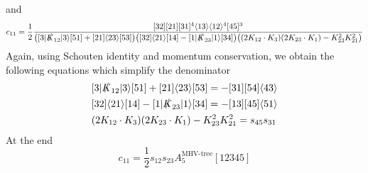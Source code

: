 and
\begin{equation}
c_{11} = \frac{1}{2}\frac{[32][21][31]^4\langle 13\rangle\langle 12 \rangle^4 [45]^3}{\big( [3|\slashed{K}_{12}|3\rangle [51] + [21]\langle 23\rangle [53]\big)
\big( [32]\langle 21\rangle[14] - [1|\slashed{K}_{23}|1\rangle[34]\big)
\big( (2K_{12}\cdot K_3)(2K_{23}\cdot K_1) - K_{23}^2K_{21}^2\big)
}
\end{equation}
Again, using Schouten identity and momentum conservation, we obtain the following equations which simplify the denominator
\begin{equation}
\begin{split}
& [3|\slashed{K}_{12}|3\rangle [51] + [21]\langle 23\rangle [53] = -[31][54]\langle 43 \rangle 
\\
& [32]\langle 21\rangle[14] - [1|\slashed{K}_{23}|1\rangle[34] = -[13][45]\langle 51 \rangle
\\
&
(2K_{12}\cdot K_3)(2K_{23}\cdot K_1) - K_{23}^2K_{21}^2 = s_{45}s_{31}
\end{split}
\end{equation}
At the end
\begin{equation}
c_{11} = \frac{1}{2}s_{12}s_{23}A_5^{\textrm{MHV-tree}}[12345]
\end{equation}
%
%
